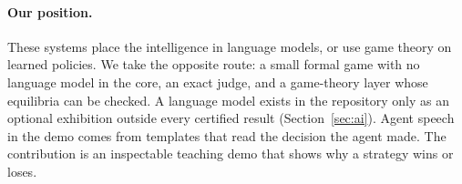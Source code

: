 \paragraph{Our position.} These systems place the intelligence in language models, or use game theory on learned policies. We take the opposite route: a small formal game with no language model in the core, an exact judge, and a game-theory layer whose equilibria can be checked. A language model exists in the repository only as an optional exhibition outside every certified result (Section~\ref{sec:ai}). Agent speech in the demo comes from templates that read the decision the agent made. The contribution is an inspectable teaching demo that shows why a strategy wins or loses.
